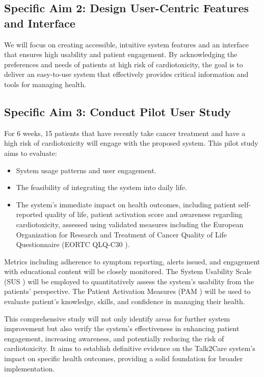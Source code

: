 \documentclass[11pt]{article}
\begin{document}
\vspace{-\baselineskip}
\subsection*{Specific Aim 2: Design User-Centric Features and Interface}

We will focus on creating accessible, intuitive system features and an interface that ensures high usability and patient engagement. By acknowledging the preferences and needs of patients at high risk of cardiotoxicity, the goal is to deliver an easy-to-use system that effectively provides critical information and tools for managing health.

\vspace{-\baselineskip}
\subsection*{Specific Aim 3: Conduct Pilot User Study} 


For 6 weeks, 15 patients that have recently take cancer treatment and have a high risk of cardiotoxicity will engage with the proposed system. This pilot study aims to evaluate: \begin{itemize}[topsep=0pt,itemsep=0pt,parsep=0pt]
  \item System usage patterns and user engagement. 
  \item The feasibility of integrating the system into daily life. 
  \item The system's immediate impact on health outcomes, including patient self-reported quality of life, patient activation score and awareness regarding cardiotoxicity, assessed using validated measures including the European Organization for Research and Treatment of Cancer Quality of Life Questionnaire (EORTC QLQ-C30 \cite{kaasaEORTCCoreQuality1995}). 
\end{itemize} 
Metrics including adherence to symptom reporting, alerts issued, and engagement with educational content will be closely monitored. The System Usability Scale (SUS \cite{brookeSUSQuickDirty1996}) will be employed to quantitatively assess the system's usability from the patients' perspective. The Patient Activation Measures (PAM \cite{hibbardDevelopmentPatientActivation2004}) will be used to evaluate patient's knowledge, skills, and confidence in managing their health.



This comprehensive study will not only identify areas for further system improvement but also verify the system's effectiveness in enhancing patient engagement, increasing awareness, and potentially reducing the risk of cardiotoxicity. It aims to establish definitive evidence on the Talk2Care system's impact on specific health outcomes, providing a solid foundation for broader implementation.
\end{document}
